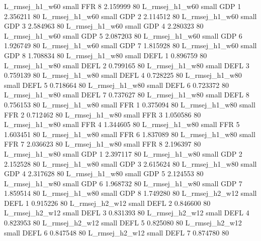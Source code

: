 L_rmsej_h1_w60      small      FFR                 8 2.159999 80
L_rmsej_h1_w60      small      GDP                 1 2.356211 80
L_rmsej_h1_w60      small      GDP                 2 2.114512 80
L_rmsej_h1_w60      small      GDP                 3 2.584963 80
L_rmsej_h1_w60      small      GDP                 4 2.280323 80
L_rmsej_h1_w60      small      GDP                 5 2.087203 80
L_rmsej_h1_w60      small      GDP                 6 1.926749 80
L_rmsej_h1_w60      small      GDP                 7 1.815928 80
L_rmsej_h1_w60      small      GDP                 8 1.708834 80
L_rmsej_h1_w80      small     DEFL                 1 0.896759 80
L_rmsej_h1_w80      small     DEFL                 2 0.799165 80
L_rmsej_h1_w80      small     DEFL                 3 0.759139 80
L_rmsej_h1_w80      small     DEFL                 4 0.728225 80
L_rmsej_h1_w80      small     DEFL                 5 0.718664 80
L_rmsej_h1_w80      small     DEFL                 6 0.723372 80
L_rmsej_h1_w80      small     DEFL                 7 0.737627 80
L_rmsej_h1_w80      small     DEFL                 8 0.756153 80
L_rmsej_h1_w80      small      FFR                 1 0.375094 80
L_rmsej_h1_w80      small      FFR                 2 0.712462 80
L_rmsej_h1_w80      small      FFR                 3 1.050586 80
L_rmsej_h1_w80      small      FFR                 4 1.344605 80
L_rmsej_h1_w80      small      FFR                 5 1.603451 80
L_rmsej_h1_w80      small      FFR                 6 1.837089 80
L_rmsej_h1_w80      small      FFR                 7 2.036623 80
L_rmsej_h1_w80      small      FFR                 8 2.196397 80
L_rmsej_h1_w80      small      GDP                 1 2.397117 80
L_rmsej_h1_w80      small      GDP                 2 2.152528 80
L_rmsej_h1_w80      small      GDP                 3 2.615624 80
L_rmsej_h1_w80      small      GDP                 4 2.317628 80
L_rmsej_h1_w80      small      GDP                 5 2.124553 80
L_rmsej_h1_w80      small      GDP                 6 1.968732 80
L_rmsej_h1_w80      small      GDP                 7 1.859514 80
L_rmsej_h1_w80      small      GDP                 8 1.749280 80
L_rmsej_h2_w12      small     DEFL                 1 0.915226 80
L_rmsej_h2_w12      small     DEFL                 2 0.846600 80
L_rmsej_h2_w12      small     DEFL                 3 0.831393 80
L_rmsej_h2_w12      small     DEFL                 4 0.823953 80
L_rmsej_h2_w12      small     DEFL                 5 0.825080 80
L_rmsej_h2_w12      small     DEFL                 6 0.847548 80
L_rmsej_h2_w12      small     DEFL                 7 0.874780 80
